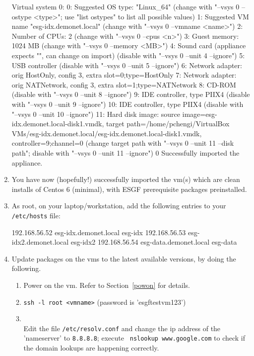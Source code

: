 \begin{enumerate}
\begin{tiny}
\begin{verbatimtab}[4]
Virtual system 0:
 0: Suggested OS type: "Linux_64"
    (change with "--vsys 0 --ostype <type>"; use "list ostypes" to list all possible values)
 1: Suggested VM name "esg-idx.demonet.local"
    (change with "--vsys 0 --vmname <name>")
 2: Number of CPUs: 2
    (change with "--vsys 0 --cpus <n>")
 3: Guest memory: 1024 MB
    (change with "--vsys 0 --memory <MB>")
 4: Sound card (appliance expects "", can change on import)
    (disable with "--vsys 0 --unit 4 --ignore")
 5: USB controller
    (disable with "--vsys 0 --unit 5 --ignore")
 6: Network adapter: orig HostOnly, config 3, extra slot=0;type=HostOnly
 7: Network adapter: orig NATNetwork, config 3, extra slot=1;type=NATNetwork
 8: CD-ROM
    (disable with "--vsys 0 --unit 8 --ignore")
 9: IDE controller, type PIIX4
    (disable with "--vsys 0 --unit 9 --ignore")
10: IDE controller, type PIIX4
    (disable with "--vsys 0 --unit 10 --ignore")
11: Hard disk image: source image=esg-idx.demonet.local-disk1.vmdk, 
target path=/home/pchengi/VirtualBox VMs/esg-idx.demonet.local/esg-idx.demonet.local-disk1.vmdk, 
controller=9;channel=0
    (change target path with "--vsys 0 --unit 11 --disk path";
    disable with "--vsys 0 --unit 11 --ignore")
0%
Successfully imported the appliance.
\end{verbatimtab}
\end{tiny}
\item You have now (hopefully!) successfully imported the vm(s) which are clean installs of Centos 6 (minimal), with ESGF prerequisite packages preinstalled.
\item As root, on your laptop/workstation, add the following entries to your \texttt{/etc/hosts} file:
\begin{verbatimtab}[4]
192.168.56.52   esg-idx.demonet.local   esg-idx
192.168.56.53   esg-idx2.demonet.local  esg-idx2
192.168.56.54   esg-data.demonet.local   esg-data
\end{verbatimtab}
\item Update packages on the vms to the latest available versions, by doing the following.
\begin{enumerate}
\item Power on the vm. Refer to Section~\ref{powon} for details.
\item \texttt{ssh -l root <vmname>} (password is 'esgftestvm123')
\item {}\\
Edit the file \texttt{/etc/resolv.conf} and change the ip address of the 'nameserver' to \texttt{8.8.8.8}; execute \texttt{ nslookup www.google.com} to check if the domain lookups are happening correctly. 

\end{enumerate}
\end{enumerate}
